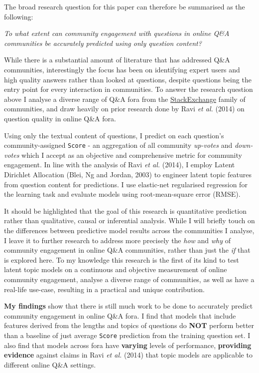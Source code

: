 \documentclass[11pt,preprint, authoryear]{article}
\numberwithin{equation}{section}
\begin{document}
The broad research question for this paper can therefore be summarised
as the following:

\begin{center}
\emph{To what extent can community engagement with questions in online Q\&A communities be accurately predicted using only question content?}
\end{center}

While there is a substantial amount of literature that has addressed
Q\&A communities, interestingly the focus has been on identifying expert
users and high quality answers rather than looked at questions, despite
questions being the entry point for every interaction in communities. To
answer the research question above I analyse a diverse range of Q\&A
fora from the \href{https://stackexchange.com/sites\#}{StackExchange}
family of communities, and draw heavily on prior research done by Ravi
\emph{et al.} (2014) on question quality in online Q\&A fora.

Using only the textual content of questions, I predict on each
question's community-assigned \texttt{Score} - an aggregation of all
community \emph{up-votes} and \emph{down-votes} which I accept as an
objective and comprehensive metric for community engagement. In line
with the analysis of Ravi \emph{et al.} (2014), I employ Latent
Dirichlet Allocation (Blei, Ng and Jordan, 2003) to engineer latent
topic features from question content for predictions. I use elastic-net
regularised regression for the learning task and evaluate models using
root-mean-square error (RMSE).

It should be highlighted that the goal of this research is quantitative
prediction rather than qualitative, causal or inferential analysis.
While I will briefly touch on the differences between predictive model
results across the communities I analyse, I leave it to further research
to address more precisely the \emph{how} and \emph{why} of community
engagement in online Q\&A communities, rather than just the \emph{if}
that is explored here. To my knowledge this research is the first of its
kind to test latent topic models on a continuous and objective
measurement of online community engagement, analyse a diverse range of
communities, as well as have a real-life use-case, resulting in a
practical and unique contribution.

\textbf{My findings} show that there is still much work to be done to
accurately predict community engagement in online Q\&A fora. I find that
models that include features derived from the lengths and topics of
questions do \textbf{NOT} perform better than a baseline of just average
\texttt{Score} prediction from the training question set. I also find
that models across fora have \textbf{varying} levels of performance,
\textbf{providing evidence} against claims in Ravi \emph{et al.} (2014)
that topic models are applicable to different online Q\&A settings.
\end{document}
